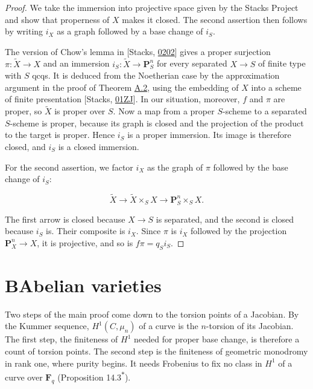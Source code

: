 \documentclass[11pt]{article}
\newcommand{\bpout}[1]{#1\textsuperscript{\hyperlink{bp-outside}{\ensuremath{\ast}}}}
\begin{document}
\begin{proof}[{Proof}]\label{bp74}%
We take the immersion into projective space given by the Stacks Project and show that properness of \(X\) makes it closed. The second assertion then follows by writing \(i_X\) as a graph followed by a base change of \(i_S\).

The version of Chow's lemma in [Stacks, \href{https://stacks.math.columbia.edu/tag/0202}{0202}] gives a proper surjection \(\pi:\widetilde X\to X\) and an immersion \(i_S:\widetilde X\to\mathbf P^n_S\) for every separated \(X\to S\) of finite type with \(S\) qcqs. It is deduced from the Noetherian case by the approximation argument in the proof of Theorem \hyperref[bp9]{A.2}, using the embedding of \(X\) into a scheme of finite presentation [Stacks, \href{https://stacks.math.columbia.edu/tag/01ZJ}{01ZJ}]. In our situation, moreover, \(f\) and \(\pi\) are proper, so \(\widetilde X\) is proper over \(S\). Now a map from a proper \(S\)-scheme to a separated \(S\)-scheme is proper, because its graph is closed and the projection of the product to the target is proper. Hence \(i_S\) is a proper immersion. Its image is therefore closed, and \(i_S\) is a closed immersion.

For the second assertion, we factor \(i_X\) as the graph of \(\pi\) followed by the base change of \(i_S\):

\[
\widetilde X\longrightarrow\widetilde X\times_SX
\longrightarrow\mathbf P^n_S\times_SX.
\]

The first arrow is closed because \(X\to S\) is separated, and the second is closed because \(i_S\) is. Their composite is \(i_X\). Since \(\pi\) is \(i_X\) followed by the projection \(\mathbf P^n_X\to X\), it is projective, and so is \(f\pi=q_Si_S\).
\end{proof}



\section*{\texorpdfstring{B\quad Abelian varieties}{B Abelian varieties}}
\label{bp75}%
\label{bp76}%
Two steps of the main proof come down to the torsion points of a Jacobian. By the Kummer sequence, \(H^1(C,\mu_n)\) of a curve is the \(n\)-torsion of its Jacobian. The first step, the finiteness of \(H^1\) needed for proper base change, is therefore a count of torsion points. The second step is the finiteness of geometric monodromy in rank one, where purity begins. It needs Frobenius to fix no class in \(H^1\) of a curve over \(\mathbf F_q\) (Proposition \bpout{14.3}).
\end{document}
